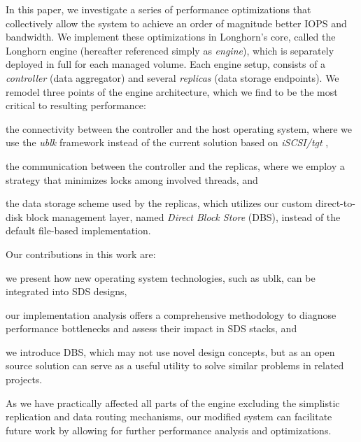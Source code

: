 In this paper, we investigate a series of performance optimizations that collectively allow the system to achieve an order of magnitude better IOPS and bandwidth. We implement these optimizations in Longhorn's core, called the Longhorn engine \cite{longhorn-engine} (hereafter referenced simply as \textit{engine}), which is separately deployed in full for each managed volume. Each engine setup, consists of a \textit{controller} (data aggregator) and several \textit{replicas} (data storage endpoints). We remodel three points of the engine architecture, which we find to be the most critical to resulting performance:
\begin{enumerate*}[label=(\roman*)]
    \item the connectivity between the controller and the host operating system, where we use the \textit{ublk} framework \cite{ublk} instead of the current solution based on \textit{iSCSI/tgt} \cite{tgt},
    \item the communication between the controller and the replicas, where we employ a strategy that minimizes locks among involved threads, and
    \item the data storage scheme used by the replicas, which utilizes our custom direct-to-disk block management layer, named \textit{Direct Block Store} (DBS), instead of the default file-based implementation.
\end{enumerate*}

Our contributions in this work are:
\begin{enumerate*}[label=(\roman*)]
    \item we present how new operating system technologies, such as ublk, can be integrated into SDS designs,
    \item our implementation analysis offers a comprehensive methodology to diagnose performance bottlenecks and assess their impact in SDS stacks, and
    \item we introduce DBS, which may not use novel design concepts, but as an open source solution can serve as a useful utility to solve similar problems in related projects.
\end{enumerate*}
As we have practically affected all parts of the engine excluding the simplistic replication and data routing mechanisms, our modified system can facilitate future work by allowing for further performance analysis and optimizations.




